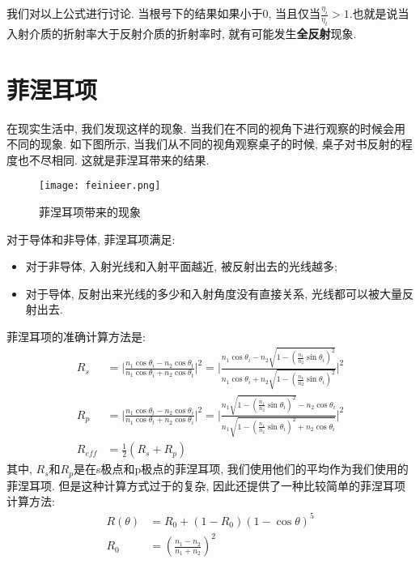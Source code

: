 我们对以上公式进行讨论. 当根号下的结果如果小于0, 当且仅当$\frac{\eta_i}{\eta_t}>1$.也就是说当入射介质的折射率大于反射介质的折射率时, 就有可能发生\textbf{全反射}现象. 

\section{菲涅耳项}

在现实生活中, 我们发现这样的现象. 当我们在不同的视角下进行观察的时候会用不同的现象. 如下图所示, 当我们从不同的视角观察桌子的时候, 桌子对书反射的程度也不尽相同. 这就是菲涅耳带来的结果. 

\begin{figure}[H]
	\centering
	\texttt{[image: feinieer.png]}
	\caption{菲涅耳项带来的现象}
	\label{fig:fne}
\end{figure}

对于导体和非导体, 菲涅耳项满足: 
\begin{itemize}
	\item 对于非导体, 入射光线和入射平面越近, 被反射出去的光线越多; 
	\item 对于导体, 反射出来光线的多少和入射角度没有直接关系, 光线都可以被大量反射出去. 
\end{itemize}

菲涅耳项的准确计算方法是: 
\begin{equation}
	\begin{split}
		R_s&= \lvert\frac{n_1\cos\theta_i-n_2\cos\theta_t}{n_1\cos\theta_i+n_2\cos\theta_t}\rvert^2 = \lvert{\frac{n_1\cos\theta_i-n_2\sqrt{1-(\frac{n_1}{n_2}\sin\theta_i)^2}}{n_1\cos\theta_i+n_2\sqrt{1-(\frac{n_1}{n_2}\sin\theta_i)^2}}}\rvert^2\\
		R_p&= \lvert\frac{n_1\cos\theta_t-n_2\cos\theta_i}{n_1\cos\theta_t+n_2\cos\theta_i}\rvert^2 = \lvert{\frac{n_1\sqrt{1-(\frac{n_1}{n_2}\sin\theta_i)^2}-n_2\cos\theta_i}{n_1\sqrt{1-(\frac{n_1}{n_2}\sin\theta_i)^2+n_2\cos\theta_i}}}\rvert^2\\
		R_{eff}&=\frac{1}{2}(R_s+R_p)
	\end{split}
\end{equation}
其中, $R_s$和$R_p$是在s极点和p极点的菲涅耳项, 我们使用他们的平均作为我们使用的菲涅耳项. 但是这种计算方式过于的复杂, 因此还提供了一种比较简单的菲涅耳项计算方法: 
\begin{equation}
	\begin{split}
		R(\theta)&=R_0+(1-R_0)(1-\cos\theta)^5\\
		R_0&=(\frac{n_1-n_2}{n_1+n_2})^2
	\end{split}
\end{equation}

